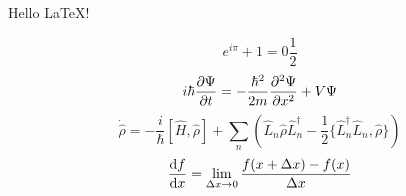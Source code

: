 \documentclass{article}
\begin{document}
Hello LaTeX!

\[
e^{i\pi} + 1 = 0
\frac{1}{2}
\]
\[
i\hbar \pdv{\Psi}{t} = -\frac{\hbar^2}{2m} \pdv[2]{\Psi}{x} + V\Psi
\]
\[\dot{\hat \rho}= -\frac{i}{\hbar} [\hat H, \hat \rho] + \sum_n \left( \hat L_n \hat \rho \hat L_n^\dagger - \frac{1}{2} \{ \hat L_n^\dagger \hat L_n, \hat \rho \} \right)
\]
\[
\dv{f}{x} = \lim_{\Delta x \to 0} \frac{f(x + \Delta x) - f(x)}{\Delta x}
\]
\end{document}
